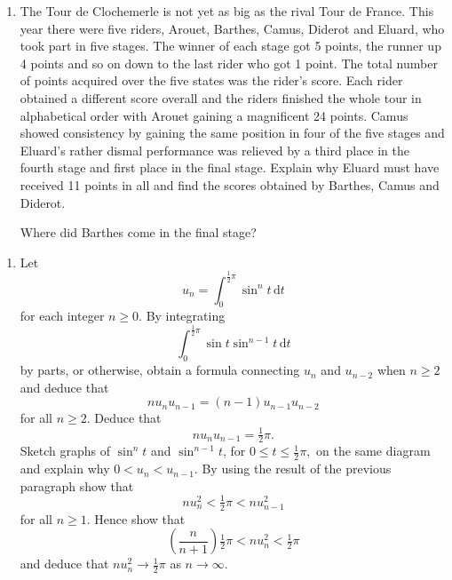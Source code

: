 \documentclass[a4, 11pt]{report}
\newlength{\qspace}
\newcounter{qnumber}
\newenvironment{question}%
 {\vspace{\qspace}
  \begin{enumerate}[\bfseries 1\quad][10]%
    \setcounter{enumi}{\value{qnumber}}%
    \item%
 }
{
  \end{enumerate}
  \filbreak
  \stepcounter{qnumber}
 }
\begin{document}
\begin{question}
The Tour de Clochemerle is not yet as big as the rival Tour de France.
This year there were five riders, Arouet, Barthes, Camus, Diderot
and Eluard, who took part in five stages. The winner of each stage
got 5 points, the runner up 4 points and so on down to the last rider
who got 1 point. The total number of points acquired over the five
states was the rider's score. Each rider obtained a different score
overall and the riders finished the whole tour in alphabetical order
with Arouet gaining a magnificent 24 points. Camus showed consistency
by gaining the same position in four of the five stages and Eluard's
rather dismal performance was relieved by a third place in the fourth
stage and first place in the final stage. Explain why Eluard must
have received 11 points in all and find the scores obtained by Barthes,
Camus and Diderot. 


Where did Barthes come in the final stage?
\end{question}

\begin{question}
Let 
\[
u_{n}=\int_{0}^{\frac{1}{2}\pi}\sin^{n}t\,\mathrm{d}t
\]
for each integer $n\geqslant0$. By integrating 
\[
\int_{0}^{\frac{1}{2}\pi}\sin t\sin^{n-1}t\,\mathrm{d}t
\]
 by parts, or otherwise, obtain a formula connecting $u_{n}$ and
$u_{n-2}$ when $n\geqslant2$ and deduce that 
\[
nu_{n}u_{n-1}=\left(n-1\right)u_{n-1}u_{n-2}
\]
for all $n\geqslant2$. Deduce that 
\[
nu_{n}u_{n-1}=\tfrac{1}{2}\pi.
\]
Sketch graphs of $\sin^{n}t$ and $\sin^{n-1}t$, for $0\leqslant t\leqslant\frac{1}{2}\pi,$
on the same diagram and explain why $0<u_{n}<u_{n-1}.$ By using the
result of the previous paragraph show that 
\[
nu_{n}^{2}<\tfrac{1}{2}\pi<nu_{n-1}^{2}
\]
for all $n\geqslant1$. Hence show that 
\[
\left(\frac{n}{n+1}\right)\tfrac{1}{2}\pi<nu_{n}^{2}<\tfrac{1}{2}\pi
\]
and deduce that $nu_{n}^{2}\rightarrow\tfrac{1}{2}\pi$ as $n\rightarrow\infty$.
	\end{question}
\end{document}
